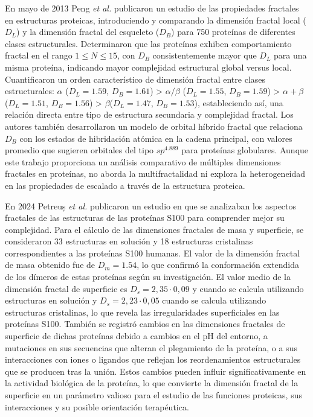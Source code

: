 En mayo de 2013 Peng \textit{et al.}\cite{Peng2013} publicaron un estudio de las propiedades fractales en estructuras proteicas, introduciendo y comparando la dimensión fractal local ($D_L$) y la dimensión fractal del esqueleto ($D_B$) para 750 proteínas de diferentes clases estructurales. Determinaron que las proteínas exhiben comportamiento fractal en el rango $1 \leq N \leq 15$, con $D_B$ consistentemente mayor que $D_L$ para una misma proteína, indicando mayor complejidad estructural global versus local. Cuantificaron un orden característico de dimensión fractal entre clases estructurales: $\alpha$ ($D_L = 1.59$, $D_B = 1.61$) > $\alpha/\beta$ ($D_L = 1.55$, $D_B = 1.59$) > $\alpha+\beta$ ($D_L = 1.51$, $D_B = 1.56$) > $\beta$($D_L = 1.47$, $D_B = 1.53$), estableciendo así, una relación directa entre tipo de estructura secundaria y complejidad fractal. Los autores también desarrollaron un modelo de orbital híbrido fractal que relaciona $D_B$ con los estados de hibridación atómica en la cadena principal, con valores promedio que sugieren orbitales del tipo $sp^{4.889}$ para proteínas globulares. Aunque este trabajo proporciona un análisis comparativo de múltiples dimensiones fractales en proteínas, no aborda la multifractalidad ni explora la heterogeneidad en las propiedades de escalado a través de la estructura proteica. 


En 2024 Petreuș \textit{et al.} \cite{Petreus2024} publicaron un estudio en que se analizaban los aspectos fractales de las estructuras de las prote\'{i}nas S100 para comprender mejor su complejidad. Para el c\'{a}lculo de las dimensiones fractales de masa y superficie, se consideraron 33 estructuras en soluci\'{o}n y 18 estructuras cristalinas correspondientes a las prote\'{i}nas S100 humanas. El valor de la dimensi\'{o}n fractal de masa obtenido fue de $D_m = 1.54$, lo que confirm\'{o} la conformaci\'{o}n extendida de los d\'{i}meros de estas prote\'{i}nas seg\'{u}n su investigaci\'{o}n. El valor medio de la dimensi\'{o}n fractal de superficie es $D_s = 2,35 \cdot 0,09$ y cuando se calcula utilizando estructuras en soluci\'{o}n y $D_s = 2,23 \cdot 0,05$ cuando se calcula utilizando estructuras cristalinas, lo que revela las irregularidades superficiales en las prote\'{i}nas S100. También se registró cambios en las dimensiones fractales de superficie de dichas prote\'{i}nas debido a cambios en el pH del entorno, a mutaciones en sus secuencias que alteran el plegamiento de la prote\'{i}na, o a sus interacciones con iones o ligandos que reflejan los reordenamientos estructurales que se producen tras la uni\'{o}n. Estos cambios pueden influir significativamente en la actividad biol\'{o}gica de la prote\'{i}na, lo que convierte la dimensi\'{o}n fractal de la superficie en un par\'{a}metro valioso para el estudio de las funciones proteicas, sus interacciones y su posible orientaci\'{o}n terap\'{e}utica.

